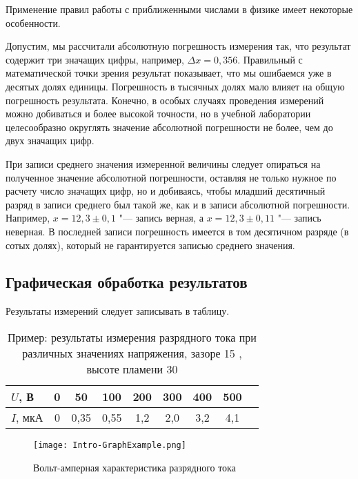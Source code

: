 \documentclass[a4paper, 12pt]{extarticle}
\begin{document}
Применение правил работы с приближенными числами в физике имеет некоторые особенности.

Допустим, мы рассчитали абсолютную погрешность измерения так, что результат содержит три значащих цифры, например, $\Delta x = 0,356$. Правильный с математической точки зрения результат показывает, что мы ошибаемся уже в десятых долях единицы. Погрешность в тысячных долях мало влияет на общую погрешность результата. Конечно, в особых случаях проведения измерений можно добиваться и более высокой точности, но в учебной лаборатории целесообразно округлять значение абсолютной погрешности не более, чем до двух значащих цифр.

При записи среднего значения измеренной величины следует опираться на полученное значение абсолютной погрешности, оставляя не только нужное по расчету число значащих цифр, но и добиваясь, чтобы младший десятичный разряд в записи среднего был такой же, как и в записи абсолютной погрешности. Например, $x = 12,3 \pm 0,1$ "--- запись верная, а $x = 12,3 \pm 0,11$ "--- запись неверная. В последней записи погрешность имеется в том десятичном разряде (в сотых долях), который не гарантируется записью среднего значения.

\subsection{Графическая обработка результатов}

Результаты измерений следует записывать в таблицу.

\begin{table}[b]
\caption{Пример: результаты измерения разрядного тока при различных значениях напряжения, зазоре 15 , высоте пламени 30  \label{tab:example-exp}}
\begin{center}
\begin{tabular}{|l|c|c|c|c|c|c|c|c|}
\hline
$U$, В   & 0 & 50   & 100  & 200 & 300 & 400 & 500 \\ \hline
$I$, мкА & 0 & 0,35 & 0,55 & 1,2 & 2,0 & 3,2 & 4,1 \\ \hline
\end{tabular}
\end{center}
\end{table}

\begin{figure}[t]
\begin{center}
\texttt{[image: Intro-GraphExample.png]}
\end{center}
\caption{Вольт-амперная характеристика разрядного тока \label{fig:example-exp-plot}}
\end{figure}
\end{document}
